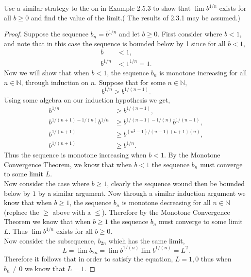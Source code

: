 \documentclass[12pt]{article}
\makeatletter
\theoremstyle{homework}
\newenvironment{exercise}[1]
{\def\@currentlabel{#1}\exercisecore}
{\endexercisecore}
\newcommand{\Nats}{\ensuremath{\mathbb N}}
\makeatother
\begin{document}
\begin{exercise}{2.5.6} Use a similar strategy to the on in Example 2.5.3
	to show that $\lim b^{1/n}$ exists for all $b \geq 0$ and find the value of the limit.( The results of 2.3.1 may be assumed.)\\


\begin{proof}
	Suppose the sequence $b_n = b^{1/n}$ and let $b \geq 0$. First consider where $b < 1$, and note that in this case the sequence is bounded below by 1 since for all
	$b < 1$,
	\begin{align*}
		b &< 1,\\
		b^{1/n} &< 1^{1/n} = 1.
	\end{align*}
	Now we will show that when $b < 1$, the sequence $b_n$ is monotone increasing for all $n \in \Nats$, through induction on $n$. 
	Suppose that for some $n \in \Nats$,
	\begin{equation*}
		b^{1/n} \geq b^{1/(n-1)}.  
	\end{equation*}
	Using some algebra on our induction hypothesis we get,
	\begin{align*}
		b^{1/n} &\geq b^{1/(n-1)},\\
		b^{1/(n+1) - 1/(n)}b^{1/n} &\geq b^{1/(n+1) - 1/(n)} b^{1/(n-1)},\\
		b^{1/(n+1)} &\geq b^{(n^2 - 1)/(n-1)(n+1)(n)},\\
		b^{1/(n+1)} &\geq b^{1/n}.
	\end{align*}
	Thus the sequence is monotone increasing when $b < 1$. By the Monotone Convergence Theorem, we know that
	when $b < 1$ the sequence $b_n$ must converge to some limit $L$.\\

	Now consider the case where $b \geq 1$, clearly the sequence wound then be bounded below by $1$ by a similar argument. Now through a similar induction argument we know that when $b \geq 1$, the sequence $b_n$ is monotone decreasing for all $n \in \Nats$ (replace the $\geq$ above with a $\leq$).
	Therefore by the Monotone Convergence Theorem we know that when $b \geq 1$ the sequence $b_n$ must converge to some limit $L$. Thus $\lim b^{1/n}$ exists for all $b \geq 0$.\\

	Now consider the subsequence, $b_{2n}$ which has the same limit,
	\begin{equation*}
		L = \lim b_{2n}  = \lim b^{1/(n)} \lim b^{1/(n)} = L^2.
	\end{equation*}
	Therefore it follows that in order to satisfy the equation, $L = 1, 0$ thus when $b_n \neq 0$ we know that $L = 1$. 
\end{proof}
\end{exercise}
\vspace{.5in}
\end{document}
